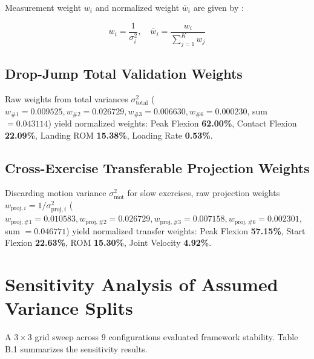 Measurement weight $w_i$ and normalized weight $\bar{w}_i$ are given by \citep{Borenstein_2013}:

\begin{equation}
  w_i = \frac{1}{\sigma_i^2}, \quad \bar{w}_i = \frac{w_i}{\sum_{j=1}^K w_j}
  \label{eq:disp4}
\end{equation}

\subsection{Drop-Jump Total Validation Weights}
\label{sec:a-3-1-drop-jump-total-validation-weights}

Raw weights from total variances $\sigma^2_{\text{total}}$ ($w_{\#1} = 0.009525, w_{\#2} = 0.026729, w_{\#3} = 0.006630, w_{\#6} = 0.000230$, sum $= 0.043114$) yield normalized weights: Peak Flexion \textbf{62.00\%}, Contact Flexion \textbf{22.09\%}, Landing ROM \textbf{15.38\%}, Loading Rate \textbf{0.53\%}.

\subsection{Cross-Exercise Transferable Projection Weights}
\label{sec:a-3-2-cross-exercise-transferable-projection-weights}

Discarding motion variance $\sigma^2_{\text{mot}}$ for slow exercises, raw projection weights $w_{\text{proj}, i} = 1 / \sigma^2_{\text{proj}, i}$ ($w_{\text{proj}, \#1} = 0.010583, w_{\text{proj}, \#2} = 0.026729, w_{\text{proj}, \#3} = 0.007158, w_{\text{proj}, \#6} = 0.002301$, sum $= 0.046771$) yield normalized transfer weights: Peak Flexion \textbf{57.15\%}, Start Flexion \textbf{22.63\%}, ROM \textbf{15.30\%}, Joint Velocity \textbf{4.92\%}.



\section{Sensitivity Analysis of Assumed Variance Splits}
\label{sec:a-4-sensitivity-analysis-of-assumed-variance-splits}


A $3 \times 3$ grid sweep across 9 configurations evaluated framework stability. Table B.1 summarizes the sensitivity results.

